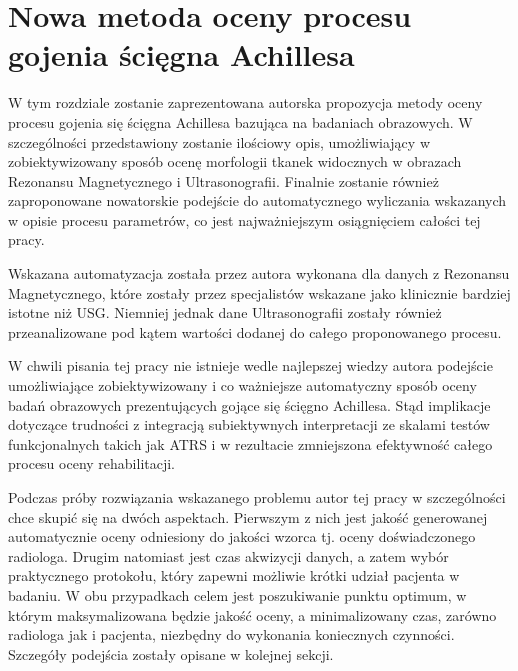 \chapter{Nowa metoda oceny procesu gojenia ścięgna Achillesa}
\label{NewMethod}



W tym rozdziale zostanie zaprezentowana autorska propozycja metody oceny procesu gojenia się ścięgna Achillesa bazująca na badaniach obrazowych. W szczególności przedstawiony zostanie ilościowy opis, umożliwiający w zobiektywizowany sposób ocenę morfologii tkanek widocznych w obrazach Rezonansu Magnetycznego i Ultrasonografii. Finalnie zostanie również zaproponowane nowatorskie podejście do automatycznego wyliczania wskazanych w opisie procesu parametrów, co jest najważniejszym osiągnięciem całości tej pracy. 

Wskazana automatyzacja została przez autora wykonana dla danych z Rezonansu Magnetycznego, które zostały przez specjalistów wskazane jako klinicznie bardziej istotne niż USG. Niemniej jednak dane Ultrasonografii zostały również przeanalizowane pod kątem wartości dodanej do całego proponowanego procesu.  

W chwili pisania tej pracy nie istnieje wedle najlepszej wiedzy autora podejście umożliwiające zobiektywizowany i co ważniejsze automatyczny sposób oceny badań obrazowych prezentujących gojące się ścięgno Achillesa. Stąd implikacje dotyczące trudności z integracją subiektywnych interpretacji ze skalami testów funkcjonalnych takich jak ATRS i w rezultacie zmniejszona efektywność całego procesu oceny rehabilitacji. 

Podczas próby rozwiązania wskazanego problemu autor tej pracy w szczególności chce skupić się na dwóch aspektach. Pierwszym z nich jest jakość generowanej automatycznie oceny odniesiony do jakości wzorca tj. oceny doświadczonego radiologa. Drugim natomiast jest czas akwizycji danych, a zatem wybór praktycznego protokołu, który zapewni możliwie krótki udział pacjenta w badaniu. W obu przypadkach celem jest poszukiwanie punktu optimum, w którym maksymalizowana będzie jakość oceny, a minimalizowany czas, zarówno radiologa jak i pacjenta, niezbędny do wykonania koniecznych czynności. Szczegóły podejścia zostały opisane w kolejnej sekcji.

